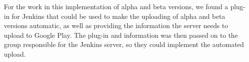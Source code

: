 For the work in this implementation of alpha and beta versions, we found a plug-in for Jenkins that could be used to make the uploading of alpha and beta versions automatic, as well as providing the information the server needs to upload to Google Play. The plug-in and information was then passed on to the group responsible for the Jenkins server, so they could implement the automated upload.